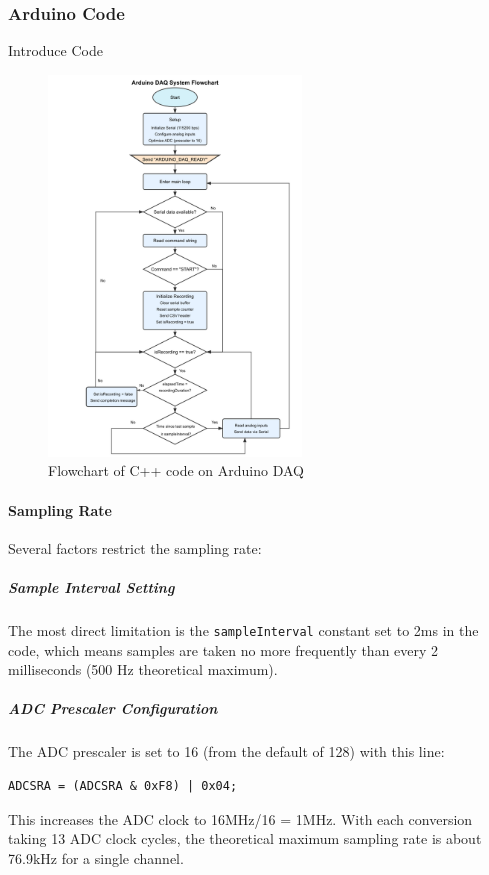 \subsubsection{Arduino Code}
Introduce Code
\begin{figure}[htbp] %
  \centering
  \includegraphics[width=0.6\textwidth]{chapters/methodology/ArduinoDAQ/flowchart_Arduino_code.png} %
  \caption{Flowchart of C++ code on Arduino DAQ}      
  \label{fig:daq_arduino_code}           
\end{figure}                            
\paragraph{Sampling Rate}
Several factors restrict the sampling rate:

\subparagraph{Sample Interval Setting}
The most direct limitation is the \texttt{sampleInterval} constant set to 2ms in the code, which means samples are taken no more frequently than every 2 milliseconds (500 Hz theoretical maximum).

\subparagraph{ADC Prescaler Configuration}
The ADC prescaler is set to 16 (from the default of 128) with this line:
\begin{verbatim}
ADCSRA = (ADCSRA & 0xF8) | 0x04;
\end{verbatim}
This increases the ADC clock to 16MHz/16 = 1MHz. With each conversion taking 13 ADC clock cycles, the theoretical maximum sampling rate is about 76.9kHz for a single channel.

